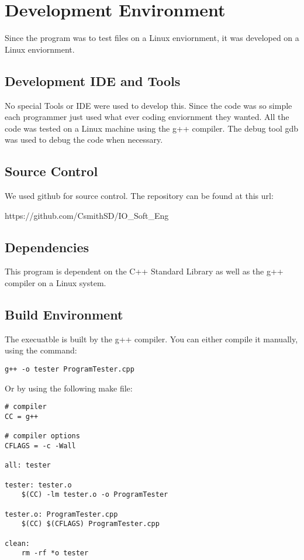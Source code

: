 \chapter{Development Environment}
Since the program was to test files on a Linux enviornment, it was developed on a Linux enviornment.


\section{Development IDE and Tools}
No special Tools or IDE were used to develop this.  Since the code was so simple
each programmer just used what ever coding enviornment they wanted.  All
the code was tested on a Linux machine using the g++ compiler.  The debug tool
gdb was used to debug the code when necessary.

\section{Source  Control}
We used github for source control.  The repository can be found at this url: 

https://github.com/CsmithSD/IO_Soft_Eng
\section{Dependencies}
This program is dependent on the C++ Standard Library as well as the g++ compiler
on a Linux system.

\section{Build  Environment}
The execuatble is built by the g++ compiler.  You can either compile it manually, using the command:
\begin{lstlisting}
g++ -o tester ProgramTester.cpp
\end{lstlisting}
Or by using the following make file:

\begin{lstlisting}
# compiler
CC = g++

# compiler options
CFLAGS = -c -Wall

all: tester

tester: tester.o
	$(CC) -lm tester.o -o ProgramTester

tester.o: ProgramTester.cpp
	$(CC) $(CFLAGS) ProgramTester.cpp

clean:
	rm -rf *o tester
\end{lstlisting}

